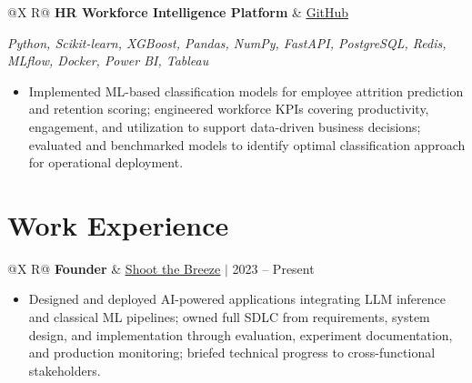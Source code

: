 \documentclass[a4paper,10pt]{article}
\newcommand{\ulink}[2]{\href{#1}{\uline{#2}}}
\newcommand{\subheading}[1]{{\color[HTML]{0A0A0A}\fontsize{12}{14}\selectfont\bfseries #1}}
\newcommand{\techstack}[1]{{\color[HTML]{5C5C5C}\fontsize{10.5}{12.5}\selectfont\itshape #1}}
\newcommand{\meta}[1]{{\color[HTML]{5C5C5C}\fontsize{10.5}{12.5}\selectfont #1}}
\begin{document}
\vspace{4pt}

\begin{tabularx}{\linewidth}{@{}X R@{}}
\subheading{HR Workforce Intelligence Platform} & \meta{\ulink{https://github.com/su-jin1425/HR-Workforce-Intelligence-Platform}{GitHub}}
\end{tabularx}
\vspace{1pt}
\techstack{Python, Scikit-learn, XGBoost, Pandas, NumPy, FastAPI, PostgreSQL, Redis, MLflow, Docker, Power BI, Tableau}
\begin{itemize}[nosep, leftmargin=1.5em, itemsep=1pt, topsep=2pt]
\item {\color[HTML]{0A0A0A}\fontsize{11}{14}\selectfont
Implemented ML-based classification models for employee attrition prediction and retention scoring; engineered workforce KPIs covering productivity, engagement, and utilization to support data-driven business decisions; evaluated and benchmarked models to identify optimal classification approach for operational deployment.}
\end{itemize}

\vspace{2pt}

\section{Work Experience}
\vspace{2pt}

\begin{tabularx}{\linewidth}{@{}X R@{}}
\subheading{Founder} & \meta{\ulink{https://shoot-the-breeze.vercel.app}{Shoot the Breeze} $|$ 2023 -- Present}
\end{tabularx}
\begin{itemize}[nosep, leftmargin=1.5em, itemsep=1pt, topsep=2pt]
\item {\color[HTML]{0A0A0A}\fontsize{11}{14}\selectfont
Designed and deployed AI-powered applications integrating LLM inference and classical ML pipelines; owned full SDLC from requirements, system design, and implementation through evaluation, experiment documentation, and production monitoring; briefed technical progress to cross-functional stakeholders.}
\end{itemize}

\vspace{4pt}
\end{document}
